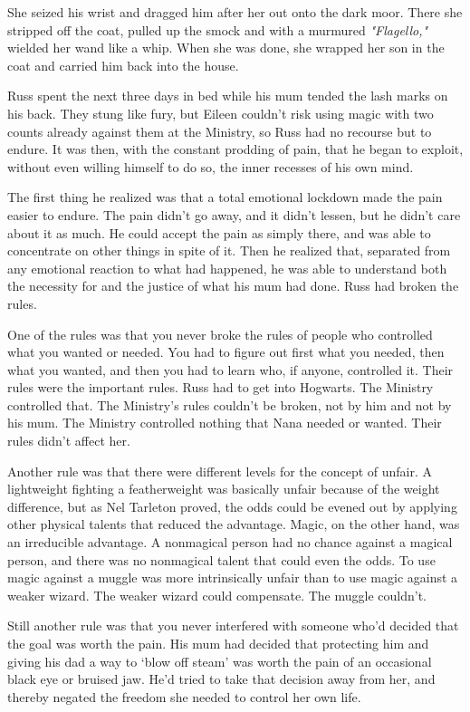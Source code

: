 She seized his wrist and dragged him after her out onto the dark moor. There she stripped off the coat, pulled up the smock and with a murmured \emph{"Flagello,"} wielded her wand like a whip. When she was done, she wrapped her son in the coat and carried him back into the house.

Russ spent the next three days in bed while his mum tended the lash marks on his back. They stung like fury, but Eileen couldn't risk using magic with two counts already against them at the Ministry, so Russ had no recourse but to endure. It was then, with the constant prodding of pain, that he began to exploit, without even willing himself to do so, the inner recesses of his own mind.

The first thing he realized was that a total emotional lockdown made the pain easier to endure. The pain didn't go away, and it didn't lessen, but he didn't care about it as much. He could accept the pain as simply there, and was able to concentrate on other things in spite of it. Then he realized that, separated from any emotional reaction to what had happened, he was able to understand both the necessity for and the justice of what his mum had done. Russ had broken the rules.

One of the rules was that you never broke the rules of people who controlled what you wanted or needed. You had to figure out first what you needed, then what you wanted, and then you had to learn who, if anyone, controlled it. Their rules were the important rules. Russ had to get into Hogwarts. The Ministry controlled that. The Ministry's rules couldn't be broken, not by him and not by his mum. The Ministry controlled nothing that Nana needed or wanted. Their rules didn't affect her.

Another rule was that there were different levels for the concept of unfair. A lightweight fighting a featherweight was basically unfair because of the weight difference, but as Nel Tarleton proved, the odds could be evened out by applying other physical talents that reduced the advantage. Magic, on the other hand, was an irreducible advantage. A nonmagical person had no chance against a magical person, and there was no nonmagical talent that could even the odds. To use magic against a muggle was more intrinsically unfair than to use magic against a weaker wizard. The weaker wizard could compensate. The muggle couldn't.

Still another rule was that you never interfered with someone who'd decided that the goal was worth the pain. His mum had decided that protecting him and giving his dad a way to `blow off steam' was worth the pain of an occasional black eye or bruised jaw. He'd tried to take that decision away from her, and thereby negated the freedom she needed to control her own life.

